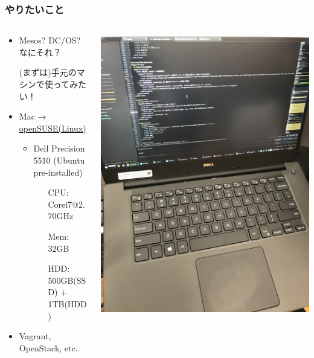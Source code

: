 \documentclass[aspectratio=169,11pt,hyperref={colorlinks=true}]{beamer}
\begin{document}
\begin{frame}
\begin{columns}[T]
\begin{column}{.5\textwidth}
    \end{column}
  \end{columns}
\end{frame}

\begin{frame}
  \frametitle{やりたいこと}
  \begin{columns}[T]
    \begin{column}{.5\textwidth}
      \begin{itemize}
        \item Mesos? DC/OS? なにそれ？
        \item[] (まずは)手元のマシンで使ってみたい！
        \item Mac → \href{https://ja.wikipedia.org/wiki/OpenSUSE}{openSUSE(Linux)}
          \begin{itemize}
            \item Dell Precision 5510 (Ubuntu pre-installed)
            \begin{itemize}
              \item[CPU:] Corei7@2.70GHz
              \item[Mem:] 32GB
              \item[HDD:] 500GB(SSD) + 1TB(HDD)
            \end{itemize}
          \end{itemize}
        \item Vagrant, OpenStack, etc.
      \end{itemize}
    \end{column}
    \begin{column}{.5\textwidth}
      \includegraphics[height=1.1\textwidth]{dell_precision_5510.jpg}
    \end{column}
  \end{columns}
\end{frame}
\end{document}

